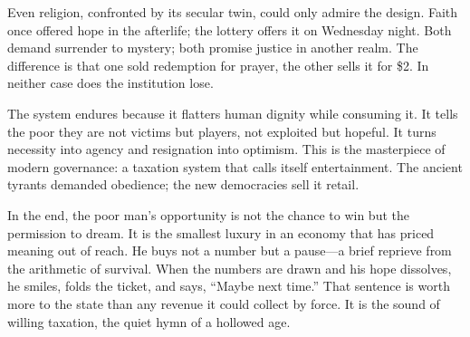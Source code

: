 \documentclass[11pt,twoside]{book}
\begin{document}
Even religion, confronted by its secular twin, could only admire the design.  
Faith once offered hope in the afterlife; the lottery offers it on Wednesday night.  
Both demand surrender to mystery; both promise justice in another realm.  
The difference is that one sold redemption for prayer, the other sells it for \$2.  
In neither case does the institution lose.

The system endures because it flatters human dignity while consuming it.  
It tells the poor they are not victims but players, not exploited but hopeful.  
It turns necessity into agency and resignation into optimism.  
This is the masterpiece of modern governance: a taxation system that calls itself entertainment.  
The ancient tyrants demanded obedience; the new democracies sell it retail.

In the end, the poor man’s opportunity is not the chance to win but the permission to dream.  
It is the smallest luxury in an economy that has priced meaning out of reach.  
He buys not a number but a pause—a brief reprieve from the arithmetic of survival.  
When the numbers are drawn and his hope dissolves, he smiles, folds the ticket, and says,  
“Maybe next time.”  
That sentence is worth more to the state than any revenue it could collect by force.  
It is the sound of willing taxation, the quiet hymn of a hollowed age.
\end{document}
